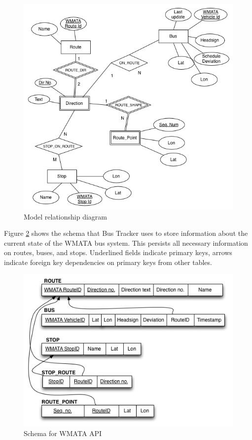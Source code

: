 \documentclass[12pt]{article}
\begin{document}
\begin{figure}[ht]
	\centerline{\includegraphics[scale=0.43]{bus-entity-rel.png}}
	\caption{Model relationship diagram}
	\label{fig:busEntity}
\end{figure}

Figure \ref{fig:busSchema} shows the schema that Bus Tracker uses to store information about the current state of the WMATA bus system.  This persists all necessary information on routes, buses, and stops.  Underlined fields indicate primary keys, arrows indicate foreign key dependencies on primary keys from other tables.  

\begin{figure}[ht]
	\centerline{\includegraphics[scale=0.6]{bus-schema.png}}
	\caption{Schema for WMATA API}
	\label{fig:busSchema}
\end{figure}
\end{document}

